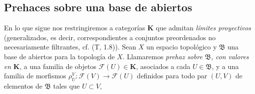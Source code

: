 \subsection{Prehaces sobre una base de abiertos}
\label{subsection:0.3.2-fr}

\begin{env}[3.2.1]
\label{0.3.2.1-fr}
En lo que sigue nos restringiremos a categorías $\boldsymbol{K}$
que admitan \emph{límites proyectivos} (generalizados, es decir,
correspondientes a conjuntos preordenados no necesariamente filtrantes,
cf. (T, 1.8)). Sean $X$ un espacio topológico y $\mathfrak{B}$ una base
de abiertos para la topología de $X$. Llamaremos \emph{prehaz sobre
$\mathfrak{B}$, con valores en $\boldsymbol{K}$}, a una familia de objetos
$\mathcal{F}(U)\in\boldsymbol{K}$, asociados a cada $U\in\mathfrak{B}$, y a una
familia de morfismos
$\rho_U^V:\mathcal{F}(V)\to\mathcal{F}(U)$ definidos para todo par $(U,V)$
de elementos de $\mathfrak{B}$ tales que $U\subset V$,



\end{env}
